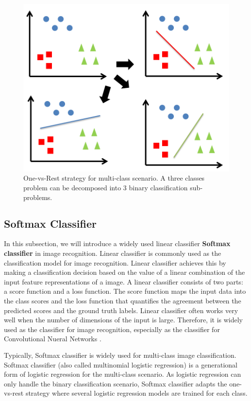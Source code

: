 \begin{figure}
	\centering
	\includegraphics[scale=.8]{relatedwork/fig/ovsa.png}
	\caption{One-vs-Rest strategy for multi-class scenario. A three classes problem can be decomposed into 3 binary classification sub-problems.}\label{fig:related:ovsa}
\end{figure}
\subsection{Softmax Classifier}
In this subsection, we will introduce a widely used linear classifier \textbf{Softmax classifier} in image recognition. Linear classifier is commonly used as the classification model for image recognition. Linear classifier achieves this by making a classification decision based on the value of a linear combination of the input feature representations of a image. A linear classifier consists of two parts: a score function and a loss function. The score function maps the input data into the class scores and the loss function that quantifies the agreement between the predicted scores and the ground truth labels. Linear classifier often works very well when the number of dimensions of the input is large. Therefore, it is widely used as the classifier for image recognition, especially as the classifier for Convolutional Nueral Networks \cite{lecun1989backpropagation}. 

Typically, Softmax classifier is widely used for multi-class image classification.
Softmax classifier (also called multinomial logistic regression) is a generational form of logistic regression for the multi-class scenario. As logistic regression can only handle the binary classification scenario, Softmax classifier adapts the one-vs-rest strategy where several logistic regression models are trained for each class. 

